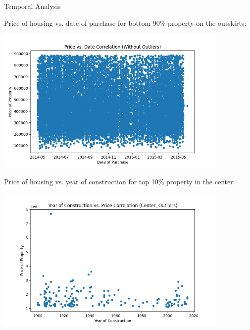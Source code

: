 \documentclass{beamer}
\begin{document}
\begin{frame}{Temporal Analysis}

Price of housing vs. date of purchase for bottom 90\% property on the outskirts:

\begin{center}
\includegraphics[width=0.85\textwidth]{price_vs_date_cleaned.png} 
\end{center}

\end{frame}

\begin{frame}{}

Price of housing vs. year of construction for top 10\% property in the center:

\begin{center}
\includegraphics[width=0.85\textwidth]{construction_vs_price_center_outliers.png} 
\end{center}

\end{frame}
\end{document}
